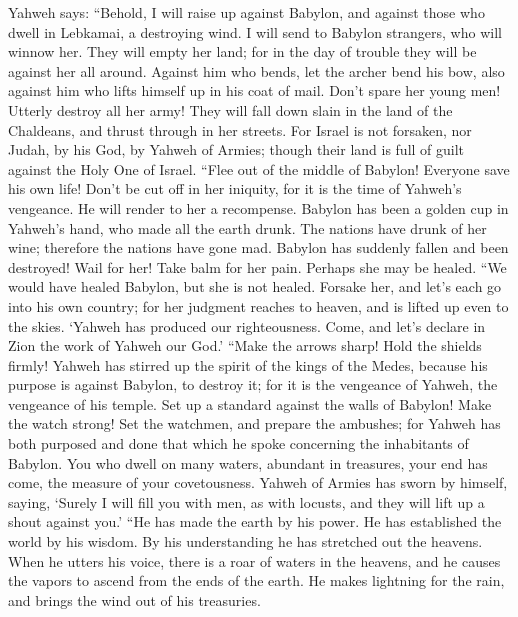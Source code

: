 Yahweh says: ``Behold, I will raise up against Babylon, and
against those who dwell in Lebkamai, a destroying wind.  I
will send to Babylon strangers, who will winnow her. They will empty her
land; for in the day of trouble they will be against her all around.
 Against him who bends, let the archer bend his bow, also
against him who lifts himself up in his coat of mail. Don't spare her
young men! Utterly destroy all her army!  They will fall
down slain in the land of the Chaldeans, and thrust through in her
streets.  For Israel is not forsaken, nor Judah, by his God,
by Yahweh of Armies; though their land is full of guilt against the Holy
One of Israel.  ``Flee out of the middle of Babylon!
Everyone save his own life! Don't be cut off in her iniquity, for it is
the time of Yahweh's vengeance. He will render to her a recompense.
 Babylon has been a golden cup in Yahweh's hand, who made
all the earth drunk. The nations have drunk of her wine; therefore the
nations have gone mad.  Babylon has suddenly fallen and been
destroyed! Wail for her! Take balm for her pain. Perhaps she may be
healed.  ``We would have healed Babylon, but she is not
healed. Forsake her, and let's each go into his own country; for her
judgment reaches to heaven, and is lifted up even to the skies.
 `Yahweh has produced our righteousness. Come, and let's
declare in Zion the work of Yahweh our God.'  ``Make the
arrows sharp! Hold the shields firmly! Yahweh has stirred up the spirit
of the kings of the Medes, because his purpose is against Babylon, to
destroy it; for it is the vengeance of Yahweh, the vengeance of his
temple.  Set up a standard against the walls of Babylon!
Make the watch strong! Set the watchmen, and prepare the ambushes; for
Yahweh has both purposed and done that which he spoke concerning the
inhabitants of Babylon.  You who dwell on many waters,
abundant in treasures, your end has come, the measure of your
covetousness.  Yahweh of Armies has sworn by himself,
saying, `Surely I will fill you with men, as with locusts, and they will
lift up a shout against you.'  ``He has made the earth by
his power. He has established the world by his wisdom. By his
understanding he has stretched out the heavens.  When he
utters his voice, there is a roar of waters in the heavens, and he
causes the vapors to ascend from the ends of the earth. He makes
lightning for the rain, and brings the wind out of his treasuries.
